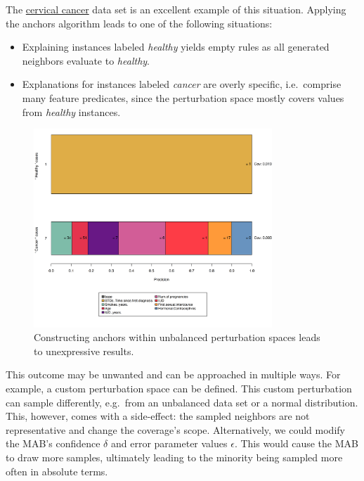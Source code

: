 \documentclass[
  11pt,
]{scrbook}
\providecommand{\tightlist}{%
  \setlength{\itemsep}{0pt}\setlength{\parskip}{0pt}}
\begin{document}
The \protect\hyperlink{cervical}{cervical cancer} data set is an excellent example of this situation.
Applying the anchors algorithm leads to one of the following situations:

\begin{itemize}
\tightlist
\item
  Explaining instances labeled \emph{healthy} yields empty rules as all generated neighbors evaluate to \emph{healthy}.
\item
  Explanations for instances labeled \emph{cancer} are overly specific, i.e.~comprise many feature predicates, since the perturbation space mostly covers values from \emph{healthy} instances.
\end{itemize}

\begin{figure}

{\centering \includegraphics[width=0.8\textwidth]{images/unnamed-chunk-37-1} 

}

\caption{Constructing anchors within unbalanced perturbation spaces leads to unexpressive results.}\label{fig:unnamed-chunk-37}
\end{figure}

This outcome may be unwanted and can be approached in multiple ways. For example, a custom perturbation space can be defined.
This custom perturbation can sample differently, e.g.~from an unbalanced data set or a normal distribution.
This, however, comes with a side-effect: the sampled neighbors are not representative and change the coverage's scope. Alternatively, we could modify the MAB's confidence \(\delta\) and error parameter values \(\epsilon\). This would cause the MAB to draw more samples, ultimately leading to the minority being sampled more often in absolute terms.
\end{document}
